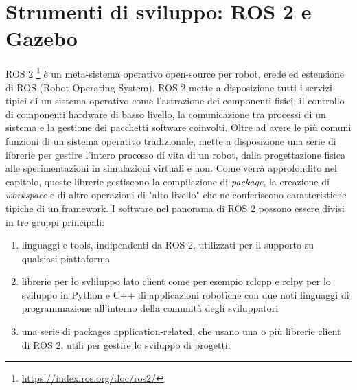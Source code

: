\documentclass[a4paper,11 pt,oneside]{book}
\theoremstyle{definition}
\begin{document}
\chapter{Strumenti di sviluppo: ROS 2 e Gazebo}

ROS 2 \footnote{\url{https://index.ros.org/doc/ros2/}} è un meta-sistema operativo open-source per robot, erede ed estensione di ROS (Robot Operating System). ROS 2 mette a disposizione tutti i servizi tipici di un sistema operativo come l'astrazione dei componenti fisici, il controllo di componenti hardware di basso livello, la comunicazione tra processi di un sistema e la gestione dei pacchetti software coinvolti. Oltre ad avere le più comuni funzioni di un sistema operativo tradizionale, mette a disposizione una serie di librerie per gestire l'intero processo di vita di un robot, dalla progettazione fisica alle sperimentazioni in simulazioni virtuali e non. Come verrà approfondito nel capitolo, queste librerie gestiscono la compilazione di \emph{package}, la creazione di \emph{workspace} e di altre operazioni di "alto livello" che ne conferiscono caratteristiche tipiche di un framework.
I software nel panorama di ROS 2 possono essere divisi in tre gruppi principali:
\begin{enumerate}
\item linguaggi e tools, indipendenti da ROS 2, utilizzati per il supporto su qualsiasi piattaforma 
\item librerie per lo svliluppo lato client come per esempio rclcpp e rclpy per lo sviluppo in Python e C++ di applicazioni robotiche con due noti linguaggi di programmazione all'interno della comunità degli sviluppatori
\item una serie di packages application-related, che usano una o più librerie client di ROS 2, utili per gestire lo sviluppo di progetti.
\end{enumerate}
\end{document}
